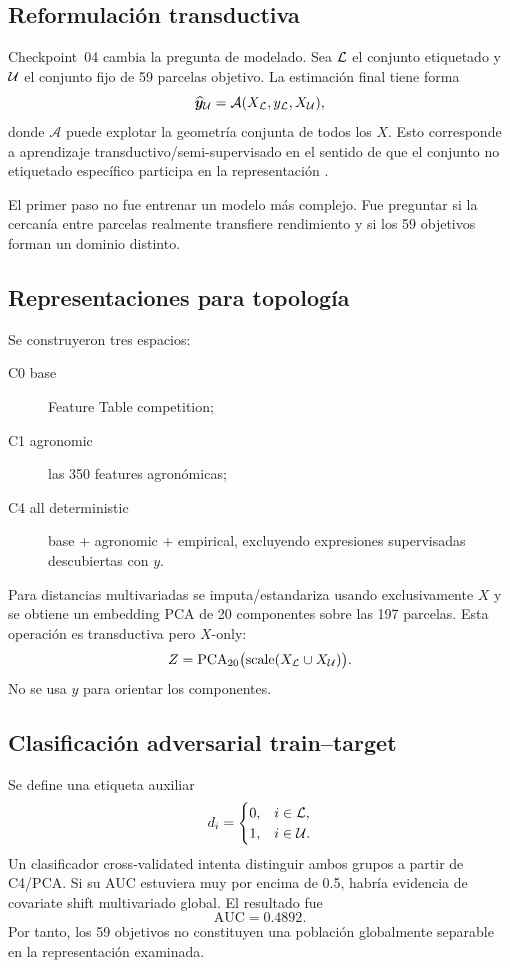 \subsection{Reformulación transductiva}

Checkpoint~04 cambia la pregunta de modelado. Sea $\mathcal{L}$ el conjunto etiquetado y
$\mathcal{U}$ el conjunto fijo de 59 parcelas objetivo. La estimación final tiene forma
\[
\widehat{\bm y}_{\mathcal{U}}
=
\mathcal A(X_{\mathcal{L}},y_{\mathcal{L}},X_{\mathcal{U}}),
\]
donde $\mathcal A$ puede explotar la geometría conjunta de todos los $X$. Esto corresponde a
aprendizaje transductivo/semi-supervisado en el sentido de que el conjunto no etiquetado
específico participa en la representación \citep{Chapelle2006,Belkin2006}.

El primer paso no fue entrenar un modelo más complejo. Fue preguntar si la cercanía entre
parcelas realmente transfiere rendimiento y si los 59 objetivos forman un dominio distinto.

\subsection{Representaciones para topología}

Se construyeron tres espacios:
\begin{description}
\item[C0 base] Feature Table competition;
\item[C1 agronomic] las 350 features agronómicas;
\item[C4 all deterministic] base + agronomic + empirical, excluyendo expresiones
supervisadas descubiertas con $y$.
\end{description}

Para distancias multivariadas se imputa/estandariza usando exclusivamente $X$ y se obtiene un
embedding PCA de 20 componentes sobre las 197 parcelas. Esta operación es transductiva pero
$X$-only:
\[
Z=\mathrm{PCA}_{20}\bigl(\mathrm{scale}(X_{\mathcal{L}}\cup X_{\mathcal{U}})\bigr).
\]
No se usa $y$ para orientar los componentes.

\subsection{Clasificación adversarial train--target}

Se define una etiqueta auxiliar
\[
d_i=
\begin{cases}
0,&i\in\mathcal{L},\\
1,&i\in\mathcal{U}.
\end{cases}
\]
Un clasificador cross-validated intenta distinguir ambos grupos a partir de C4/PCA. Si su AUC
estuviera muy por encima de 0.5, habría evidencia de covariate shift multivariado global. El
resultado fue
\[
\mathrm{AUC}=0.4892.
\]
Por tanto, los 59 objetivos no constituyen una población globalmente separable en la
representación examinada.

